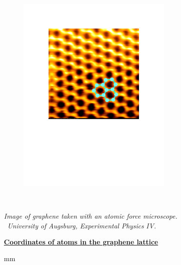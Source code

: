 {\begin{figure}[h] %
   \centering
   \includegraphics[width=3in]{graphene.pdf} 
\end{figure}
\ 
\vskip -20mm \ 
\begin{center}
\emph{Image of graphene taken with an atomic force microscope. 
\\ \textcopyright \ University of Augsburg, Experimental Physics IV.}
\end{center}




\newpage


\begin{center}
\underline{\bf Coordinates of atoms in the graphene lattice}
\end{center}

 mm

}
